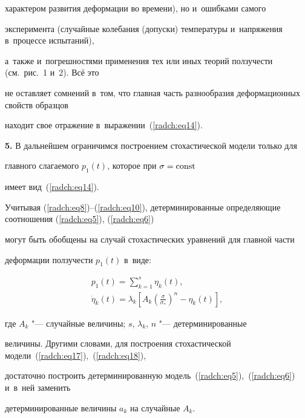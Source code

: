 характером развития деформации во времени), но и~ошибками самого 

эксперимента (случайные колебания (допуски) температуры и~напряжения в~процессе испытаний), 

а~также и~погрешностями применения тех или иных теорий ползучести (см.~рис.~1 и~2). Всё это 

не оставляет сомнений в~том, что главная часть разнообразия деформационных свойств образцов 

находит свое отражение в~выражении~(\ref{radch:eq14}).



\textbf{5.} В дальнейшем ограничимся построением стохастической модели только для 

главного слагаемого $p_1 \left( t \right)$, которое при $\sigma = \rm const$ 

имеет вид~(\ref{radch:eq14}).



Учитывая (\ref{radch:eq8})--(\ref{radch:eq10}), детерминированные определяющие соотношения (\ref{radch:eq5}), (\ref{radch:eq6}) 

могут быть обобщены на случай стохастических уравнений для главной части 

деформации ползучести $p_1 \left( t \right)$ в~виде:

\begin{gather}

\label{radch:eq17}

p_1 \left( t \right) = \sum\limits_{k = 1}^s {\eta _k \left( t \right)} ,\\

\label{radch:eq18}

\dot {\eta }_k \left( t \right) = \lambda _k \left[ {A_k \left( 

{\frac{\sigma }{\sigma _ * }} \right)^n - \eta _k \left( t \right)} 

\right],

\end{gather}

где $A_k $ "--- случайные величины; $s$, $\lambda _k$, $n$ "--- детерминированные 

величины. Другими словами, для построения стохастической модели~(\ref{radch:eq17}),~(\ref{radch:eq18}), 

достаточно построить детерминированную модель~(\ref{radch:eq5}),~(\ref{radch:eq6}) и~в~ней заменить 

детерминированные величины $a_k $ на случайные $A_k $.



